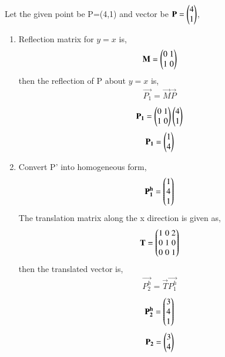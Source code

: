 \documentclass[journal]{IEEEtran}
\begin{document}
         \solution \\
         Let the given point be P=(4,1) and vector be $\mathbf{P}=\begin{pmatrix}4\\1\end{pmatrix}$,
         \begin{enumerate}[label=(\alph*)]
             \item Reflection matrix for $y=x$ is,
             \begin{align}
                 \mathbf{M}=\begin{pmatrix}0\;1\\1\;0\end{pmatrix}
             \end{align}
             then the reflection of P about $y=x$ is,
             \begin{align}
                 \vec{P_1}=\vec{M}\vec{P}
             \end{align}
             \begin{align}
                 \mathbf{P_1}=\begin{pmatrix}0\;1\\1\;0\end{pmatrix}\begin{pmatrix}4\\1\end{pmatrix}
             \end{align}
             \begin{align}
                 \mathbf{P_1}=\begin{pmatrix}1\\4\end{pmatrix}
             \end{align}
             \item Convert P' into homogeneous form,
             \begin{align}
                 \mathbf{P_1^h}=\begin{pmatrix}1\\4\\1\end{pmatrix}
             \end{align}
             The translation matrix along the x direction is given as,
             \begin{align}
                 \mathbf{T}=\begin{pmatrix}1\;0\;2\\0\;1\;0\\0\;0\;1\end{pmatrix}
             \end{align}
             then the translated vector is,
             \begin{align}
                 \vec{P_2^h}=\vec{T}\vec{P_1^h}
             \end{align}
             \begin{align}
                 \mathbf{P_2^h}=\begin{pmatrix}3\\4\\1\end{pmatrix}
             \end{align}
             \begin{align}
                 \vec{P_2}=\myvec{3\\4}

\end{align}
\end{enumerate}
\end{document}
